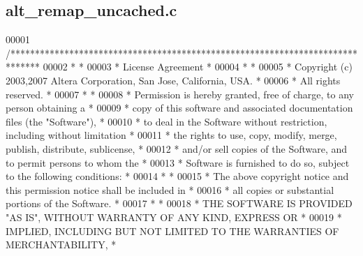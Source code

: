 \subsection{alt\+\_\+remap\+\_\+uncached.\+c}
\label{alt__remap__uncached_8c_source}

\begin{DoxyCode}
00001 \textcolor{comment}{/******************************************************************************}
00002 \textcolor{comment}{*                                                                             *}
00003 \textcolor{comment}{* License Agreement                                                           *}
00004 \textcolor{comment}{*                                                                             *}
00005 \textcolor{comment}{* Copyright (c) 2003,2007 Altera Corporation, San Jose, California, USA.      *}
00006 \textcolor{comment}{* All rights reserved.                                                        *}
00007 \textcolor{comment}{*                                                                             *}
00008 \textcolor{comment}{* Permission is hereby granted, free of charge, to any person obtaining a     *}
00009 \textcolor{comment}{* copy of this software and associated documentation files (the "Software"),  *}
00010 \textcolor{comment}{* to deal in the Software without restriction, including without limitation   *}
00011 \textcolor{comment}{* the rights to use, copy, modify, merge, publish, distribute, sublicense,    *}
00012 \textcolor{comment}{* and/or sell copies of the Software, and to permit persons to whom the       *}
00013 \textcolor{comment}{* Software is furnished to do so, subject to the following conditions:        *}
00014 \textcolor{comment}{*                                                                             *}
00015 \textcolor{comment}{* The above copyright notice and this permission notice shall be included in  *}
00016 \textcolor{comment}{* all copies or substantial portions of the Software.                         *}
00017 \textcolor{comment}{*                                                                             *}
00018 \textcolor{comment}{* THE SOFTWARE IS PROVIDED "AS IS", WITHOUT WARRANTY OF ANY KIND, EXPRESS OR  *}
00019 \textcolor{comment}{* IMPLIED, INCLUDING BUT NOT LIMITED TO THE WARRANTIES OF MERCHANTABILITY,    *}

\end{DoxyCode}
